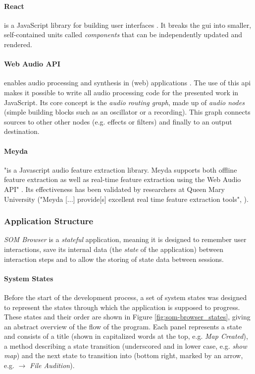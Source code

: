\paragraph*{React}
\label{para:react}
is a JavaScript library for building user interfaces \citep{react2019}. It
breaks the \gls{gui} into smaller, self-contained units called
\textit{components} that can be independently updated and rendered.

\paragraph*{Web Audio API}
\label{para:web_audio_api}
enables audio processing and synthesis in (web) applications
\citep{webaudio2019}. The use of this \gls{api} makes it possible to write all
audio processing code for the presented work in JavaScript. Its core concept is
the \textit{audio routing graph}, made up of \textit{audio nodes} (simple
building blocks such as an oscillator or a recording). This graph connects
sources to other other nodes (e.g. effects or filters) and finally to an output
destination.

\paragraph*{Meyda}
\label{para:meyda}
"is a Javascript audio feature extraction library. Meyda supports both offline
feature extraction as well as real-time feature extraction using the Web Audio
API" \citep{web:meyda2019}. Its effectiveness has been validated by researchers
at Queen Mary University ("Meyda [...] provide[s] excellent real time feature
extraction tools", \citet{moffat2015}).

\subsubsection{Application Structure}
\label{subsubsec:som-browser_structure}
\textit{SOM Browser} is a \textit{stateful} application, meaning it is designed
to remember user interactions, save its internal data (the \textit{state} of
the application) between interaction steps and to allow the storing of state
data between sessions.

\paragraph*{System States}
\label{para:som-browser_states}
Before the start of the development process, a set of system states was designed
to represent the states through which the application is supposed to progress.
These states and their order are shown in Figure \ref{fig:som-browser_states},
giving an abstract overview of the flow of the program. Each panel represents
a state and consists of a title (shown in capitalized words at the top, e.g.
\textit{Map Created}), a method describing a state transition (underscored and
in lower case, e.g. \textit{show map}) and the next state to transition into
(bottom right, marked by an arrow, e.g. $ \rightarrow $ \textit{File Audition}).

